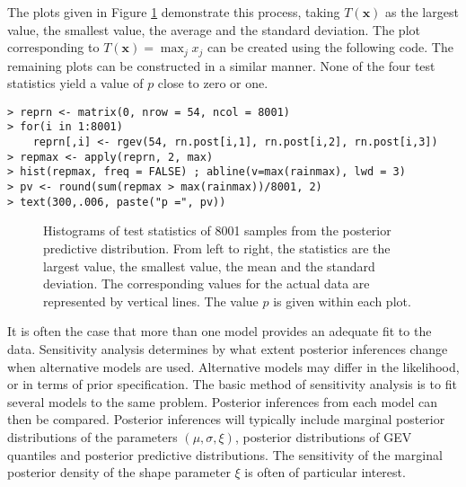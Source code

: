 \documentclass[11pt,a4paper]{article}
\newcommand{\bs}{\boldsymbol}
\begin{document}
The plots given in Figure \ref{diagrainT} demonstrate this process, taking $T(\bs{x})$ as the largest value, the smallest value, the average and the standard deviation.
The plot corresponding to $T(\bs{x}) = \max_j x_j$ can be created using the following code. The remaining plots can be constructed in a similar manner.
None of the four test statistics yield a value of $p$ close to zero or one.

\begin{verbatim} 
> reprn <- matrix(0, nrow = 54, ncol = 8001)
> for(i in 1:8001) 
    reprn[,i] <- rgev(54, rn.post[i,1], rn.post[i,2], rn.post[i,3])
> repmax <- apply(reprn, 2, max)
> hist(repmax, freq = FALSE) ; abline(v=max(rainmax), lwd = 3)
> pv <- round(sum(repmax > max(rainmax))/8001, 2)
> text(300,.006, paste("p =", pv))
\end{verbatim}

\begin{figure}
\begin{center}
\vspace{-1.5cm}
\hspace{-0.5cm}
\hspace{-0.5cm}
\hspace{-0.5cm}
\end{center}
\caption{Histograms of test statistics of 8001 samples from the posterior predictive distribution. From left to right, the statistics are the largest value, the smallest value, the mean and the standard deviation.
The corresponding values for the actual data are represented by vertical lines.
The value $p$ is given within each plot.}
\label{diagrainT}
\end{figure}

It is often the case that more than one model provides an adequate fit to the data.
Sensitivity analysis determines by what extent posterior inferences change when alternative models are used.
Alternative models may differ in the likelihood, or in terms of prior specification.
The basic method of sensitivity analysis is to fit several models to the same problem.
Posterior inferences from each model can then be compared.
Posterior inferences will typically include marginal posterior distributions of the parameters $(\mu,\sigma,\xi)$, posterior distributions of GEV quantiles and posterior predictive distributions.
The sensitivity of the marginal posterior density of the shape parameter $\xi$ is often of particular interest. 
\end{document}
